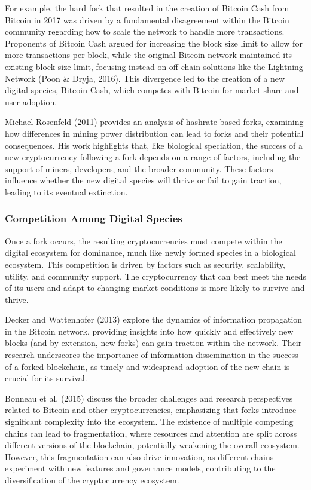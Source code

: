 \documentclass[12pt,twoside]{article}
\begin{document}
For example, the hard fork that resulted in the creation of Bitcoin Cash from Bitcoin in 2017 was driven by a fundamental disagreement within the Bitcoin community regarding how to scale the network to handle more transactions. Proponents of Bitcoin Cash argued for increasing the block size limit to allow for more transactions per block, while the original Bitcoin network maintained its existing block size limit, focusing instead on off-chain solutions like the Lightning Network (Poon & Dryja, 2016). This divergence led to the creation of a new digital species, Bitcoin Cash, which competes with Bitcoin for market share and user adoption.

Michael Rosenfeld (2011) provides an analysis of hashrate-based forks, examining how differences in mining power distribution can lead to forks and their potential consequences. His work highlights that, like biological speciation, the success of a new cryptocurrency following a fork depends on a range of factors, including the support of miners, developers, and the broader community. These factors influence whether the new digital species will thrive or fail to gain traction, leading to its eventual extinction.

\subsubsection{Competition Among Digital Species}

Once a fork occurs, the resulting cryptocurrencies must compete within the digital ecosystem for dominance, much like newly formed species in a biological ecosystem. This competition is driven by factors such as security, scalability, utility, and community support. The cryptocurrency that can best meet the needs of its users and adapt to changing market conditions is more likely to survive and thrive.

Decker and Wattenhofer (2013) explore the dynamics of information propagation in the Bitcoin network, providing insights into how quickly and effectively new blocks (and by extension, new forks) can gain traction within the network. Their research underscores the importance of information dissemination in the success of a forked blockchain, as timely and widespread adoption of the new chain is crucial for its survival.

Bonneau et al. (2015) discuss the broader challenges and research perspectives related to Bitcoin and other cryptocurrencies, emphasizing that forks introduce significant complexity into the ecosystem. The existence of multiple competing chains can lead to fragmentation, where resources and attention are split across different versions of the blockchain, potentially weakening the overall ecosystem. However, this fragmentation can also drive innovation, as different chains experiment with new features and governance models, contributing to the diversification of the cryptocurrency ecosystem.
\end{document}

